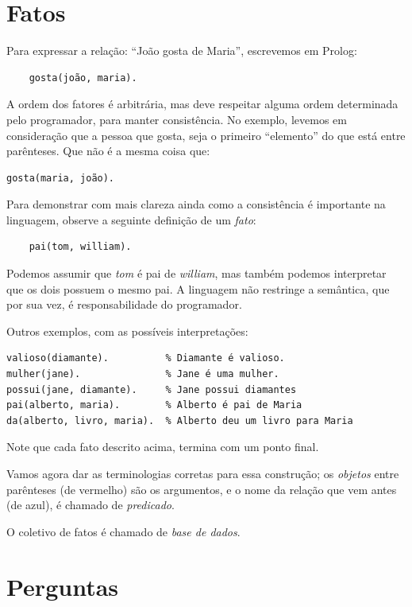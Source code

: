 \section{Fatos}

Para expressar a relação: ``João gosta de Maria'', escrevemos em Prolog:

\begin{verbatim}
    gosta(joão, maria).
\end{verbatim}

A ordem dos fatores é arbitrária, mas deve respeitar alguma ordem determinada
pelo programador, para manter consistência. No exemplo, levemos em consideração
que a pessoa que gosta, seja o primeiro ``elemento'' do que está entre
parênteses. Que não é a mesma coisa que:

\begin{verbatim}
gosta(maria, joão).
\end{verbatim}

Para demonstrar com mais clareza ainda como a consistência é importante na
linguagem, observe a seguinte definição de um \emph{fato}:
\begin{verbatim}
    pai(tom, william).
\end{verbatim}
Podemos assumir que \emph{tom} é pai de \emph{william}, mas também podemos
interpretar que os dois possuem o mesmo pai. A linguagem não restringe a
semântica, que por sua vez, é responsabilidade do programador.

Outros exemplos, com as possíveis interpretações:
\begin{verbatim}
valioso(diamante).          % Diamante é valioso.
mulher(jane).               % Jane é uma mulher.
possui(jane, diamante).     % Jane possui diamantes
pai(alberto, maria).        % Alberto é pai de Maria
da(alberto, livro, maria).  % Alberto deu um livro para Maria
\end{verbatim}

Note que cada fato descrito acima, termina com um ponto final.

Vamos agora dar as terminologias corretas para essa construção; os
\emph{objetos} entre parênteses (de vermelho) são os argumentos, e o nome da
relação que vem antes (de azul), é chamado de \emph{predicado}.

O coletivo de fatos é chamado de \emph{base de dados}.

\section{Perguntas}

